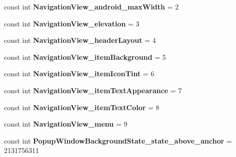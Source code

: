\begin{DoxyCompactItemize}
const int {\bfseries Navigation\+View\+\_\+android\+\_\+max\+Width} = 2
\item 
\mbox{\label{classst_delivery_1_1_resource_1_1_styleable_a63f7ad459e6a93616f4afdf4bd08599a}} 
const int {\bfseries Navigation\+View\+\_\+elevation} = 3
\item 
\mbox{\label{classst_delivery_1_1_resource_1_1_styleable_a00f0c80832af51ff84a12f169a92b0af}} 
const int {\bfseries Navigation\+View\+\_\+header\+Layout} = 4
\item 
\mbox{\label{classst_delivery_1_1_resource_1_1_styleable_aa9a105a5436c8bf8ddc34f00f2f686f3}} 
const int {\bfseries Navigation\+View\+\_\+item\+Background} = 5
\item 
\mbox{\label{classst_delivery_1_1_resource_1_1_styleable_ac404ecb824836df0b0fa0d603aa68d29}} 
const int {\bfseries Navigation\+View\+\_\+item\+Icon\+Tint} = 6
\item 
\mbox{\label{classst_delivery_1_1_resource_1_1_styleable_a06983a6593f12cb5a9823a39407e125b}} 
const int {\bfseries Navigation\+View\+\_\+item\+Text\+Appearance} = 7
\item 
\mbox{\label{classst_delivery_1_1_resource_1_1_styleable_a56eca915e23ae65093f6bb41bdf3012c}} 
const int {\bfseries Navigation\+View\+\_\+item\+Text\+Color} = 8
\item 
\mbox{\label{classst_delivery_1_1_resource_1_1_styleable_a311d7e6289559ad5026edf412e00e11b}} 
const int {\bfseries Navigation\+View\+\_\+menu} = 9
\item 
\mbox{\label{classst_delivery_1_1_resource_1_1_styleable_a432c78db60aef54759478706378329a5}} 
const int {\bfseries Popup\+Window\+Background\+State\+\_\+state\+\_\+above\+\_\+anchor} = 2131756311
\item 
\mbox{\label{classst_delivery_1_1_resource_1_1_styleable_ab7c44b543a589f75be4d7558df42ee66}} 

\end{DoxyCompactItemize}
